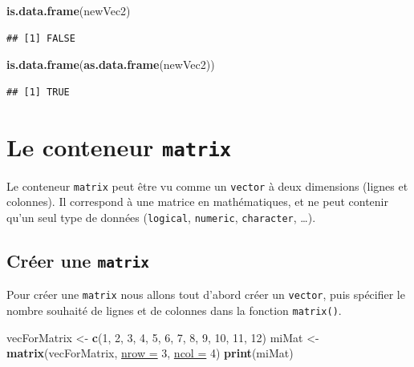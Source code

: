 \documentclass[twoside,symmetric]{book}
\newenvironment{Shaded}{}{}
\newcommand{\DataTypeTok}[1]{\underline{#1}}
\newcommand{\DecValTok}[1]{#1}
\newcommand{\KeywordTok}[1]{\textbf{#1}}
\newcommand{\NormalTok}[1]{#1}
\newcommand{\StringTok}[1]{#1}
\begin{document}
\begin{Shaded}
\begin{Highlighting}[]
\KeywordTok{is.data.frame}\NormalTok{(newVec2)}
\end{Highlighting}
\end{Shaded}

\begin{verbatim}
## [1] FALSE
\end{verbatim}

\begin{Shaded}
\begin{Highlighting}[]
\KeywordTok{is.data.frame}\NormalTok{(}\KeywordTok{as.data.frame}\NormalTok{(newVec2))}
\end{Highlighting}
\end{Shaded}

\begin{verbatim}
## [1] TRUE
\end{verbatim}

\hypertarget{l014matrix}{%
\section{\texorpdfstring{Le conteneur \texttt{matrix}}{Le conteneur matrix}}\label{l014matrix}}

Le conteneur \texttt{matrix} peut être vu comme un \texttt{vector} à deux dimensions (lignes et colonnes). Il correspond à une matrice en mathématiques, et ne peut contenir qu'un seul type de données (\texttt{logical}, \texttt{numeric}, \texttt{character}, \ldots{}).

\hypertarget{cruxe9er-une-matrix}{%
\subsection{\texorpdfstring{Créer une \texttt{matrix}}{Créer une matrix}}\label{cruxe9er-une-matrix}}

Pour créer une \texttt{matrix} nous allons tout d'abord créer un \texttt{vector}, puis spécifier le nombre souhaité de lignes et de colonnes dans la fonction \texttt{matrix()}.

\begin{Shaded}
\begin{Highlighting}[]
\NormalTok{vecForMatrix <-}\StringTok{ }\KeywordTok{c}\NormalTok{(}\DecValTok{1}\NormalTok{, }\DecValTok{2}\NormalTok{, }\DecValTok{3}\NormalTok{, }\DecValTok{4}\NormalTok{, }\DecValTok{5}\NormalTok{, }\DecValTok{6}\NormalTok{, }\DecValTok{7}\NormalTok{, }\DecValTok{8}\NormalTok{, }\DecValTok{9}\NormalTok{, }\DecValTok{10}\NormalTok{, }\DecValTok{11}\NormalTok{, }\DecValTok{12}\NormalTok{)}
\NormalTok{miMat <-}\StringTok{ }\KeywordTok{matrix}\NormalTok{(vecForMatrix, }\DataTypeTok{nrow =} \DecValTok{3}\NormalTok{, }\DataTypeTok{ncol =} \DecValTok{4}\NormalTok{)}
\KeywordTok{print}\NormalTok{(miMat)}
\end{Highlighting}
\end{Shaded}
\end{document}
